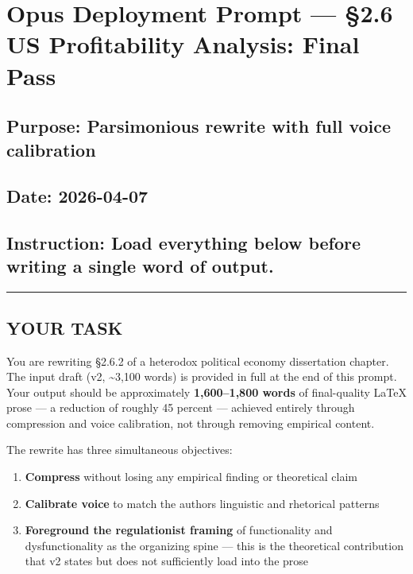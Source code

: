 \section{Opus Deployment Prompt --- §2.6 US Profitability Analysis:
Final
Pass}\label{opus-deployment-prompt--26-us-profitability-analysis-final-pass}

\subsection{Purpose: Parsimonious rewrite with full voice
calibration}\label{purpose-parsimonious-rewrite-with-full-voice-calibration}

\subsection{Date: 2026-04-07}\label{date-2026-04-07}

\subsection{Instruction: Load everything below before writing a single
word of
output.}\label{instruction-load-everything-below-before-writing-a-single-word-of-output}

\begin{center}\rule{0.5\linewidth}{0.5pt}\end{center}

\subsection{YOUR TASK}\label{your-task}

You are rewriting §2.6.2 of a heterodox political economy dissertation
chapter. The input draft (v2, \textasciitilde3,100 words) is provided in
full at the end of this prompt. Your output should be approximately
\textbf{1,600--1,800 words} of final-quality LaTeX prose --- a reduction
of roughly 45 percent --- achieved entirely through compression and
voice calibration, not through removing empirical content.

The rewrite has three simultaneous objectives:

\begin{enumerate}
\def\labelenumi{\arabic{enumi}.}
\tightlist
\item
  \textbf{Compress} without losing any empirical finding or theoretical
  claim
\item
  \textbf{Calibrate voice} to match the author\textquotesingle s
  linguistic and rhetorical patterns
\item
  \textbf{Foreground the regulationist framing} of functionality and
  dysfunctionality as the organizing spine --- this is the theoretical
  contribution that v2 states but does not sufficiently load into the
  prose
\end{enumerate}

